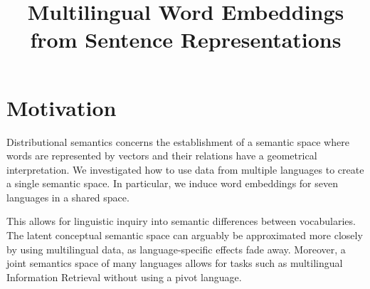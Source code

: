\documentclass[a4paper,11pt]{article}
\title{Multilingual Word Embeddings from Sentence Representations}
\date{}
\begin{document}
\maketitle
\thispagestyle{empty}
\pagestyle{empty}


\section*{Motivation}



Distributional semantics concerns the establishment of a semantic space where words are represented by vectors and their relations have a geometrical interpretation. We investigated how to use data from multiple languages to create a single semantic space. In particular, we induce word embeddings for seven languages in a shared space.  

This allows for linguistic inquiry into semantic differences between vocabularies. The latent conceptual semantic space can arguably be approximated more closely by using multilingual data, as language-specific effects fade away. 
Moreover, a joint semantics space of many languages allows for tasks such as multilingual Information Retrieval without using a pivot language.



\end{document}
